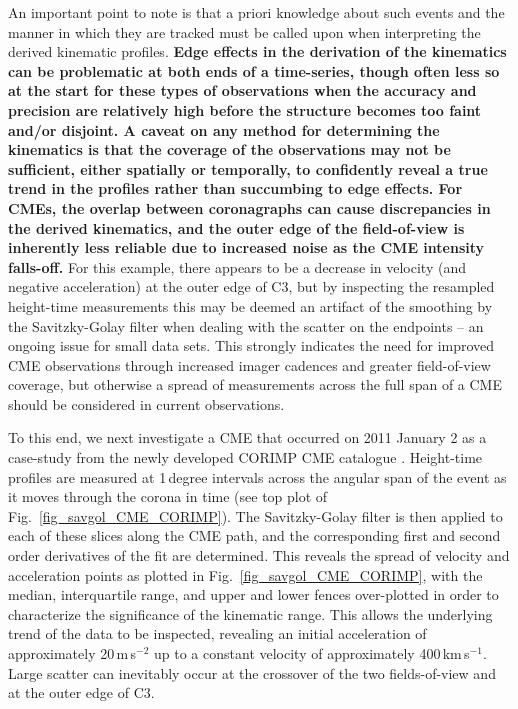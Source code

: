 \documentclass[structabstract]{aa}
\begin{document}
An important point to note is that a priori knowledge about such events and the manner in which they are tracked must be called upon when interpreting the derived kinematic profiles. {\bf Edge effects in the derivation of the kinematics can be problematic at both ends of a time-series, though often less so at the start for these types of observations when the accuracy and precision are relatively high before the structure becomes too faint and/or disjoint. A caveat on any method for determining the kinematics is that the coverage of the observations may not be sufficient, either spatially or temporally, to confidently reveal a true trend in the profiles rather than succumbing to edge effects. For CMEs, the overlap between coronagraphs can cause discrepancies in the derived kinematics, and the outer edge of the field-of-view is inherently less reliable due to increased noise as the CME intensity falls-off.} For this example, there appears to be a decrease in velocity (and negative acceleration) at the outer edge of C3, but by inspecting the resampled height-time measurements this may be deemed an artifact of the smoothing by the Savitzky-Golay filter when dealing with the scatter on the endpoints -- an ongoing issue for small data sets. This strongly indicates the need for improved CME observations through increased imager cadences and greater field-of-view coverage, but otherwise a spread of measurements across the full span of a CME should be considered in current observations.

To this end, we next investigate a CME that occurred on 2011 January 2 as a case-study from the newly developed CORIMP CME catalogue \citep{2012ApJ...752..144M, 2012ApJ...752..145B}. Height-time profiles are measured at 1\,degree intervals across the angular span of the event as it moves through the corona in time (see top plot of Fig.~\ref{fig_savgol_CME_CORIMP}). The Savitzky-Golay filter is then applied to each of these slices along the CME path, and the corresponding first and second order derivatives of the fit are determined. This reveals the spread of velocity and acceleration points as plotted in Fig.~\ref{fig_savgol_CME_CORIMP}, with the median, interquartile range, and upper and lower fences over-plotted in order to characterize the significance of the kinematic range. This allows the underlying trend of the data to be inspected, revealing an initial acceleration of approximately 20\,m\,s$^{-2}$ up to a constant velocity of approximately 400\,km\,s$^{-1}$. Large scatter can inevitably occur at the crossover of the two fields-of-view and at the outer edge of C3.
\end{document}
